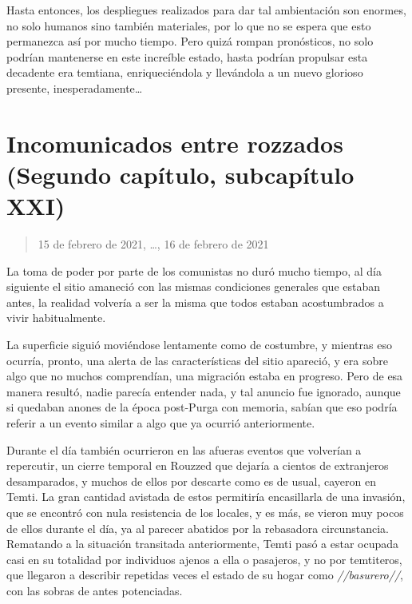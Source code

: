 \documentclass[
  spanish,
]{book}
\begin{document}
Hasta entonces, los despliegues realizados para dar tal ambientación son enormes, no solo humanos sino también materiales, por lo que no se espera que esto permanezca así por mucho tiempo. Pero quizá rompan pronósticos, no solo podrían mantenerse en este increíble estado, hasta podrían propulsar esta decadente era temtiana, enriqueciéndola y llevándola a un nuevo glorioso presente, inesperadamente\ldots{}

\hypertarget{incomunicados-entre-rozzados-segundo-capuxedtulo-subcapuxedtulo-xxi}{%
\section{Incomunicados entre rozzados (Segundo capítulo, subcapítulo XXI)}\label{incomunicados-entre-rozzados-segundo-capuxedtulo-subcapuxedtulo-xxi}}

\begin{quote}
15 de febrero de 2021, \ldots, 16 de febrero de 2021
\end{quote}

La toma de poder por parte de los comunistas no duró mucho tiempo, al día siguiente el sitio amaneció con las mismas condiciones generales que estaban antes, la realidad volvería a ser la misma que todos estaban acostumbrados a vivir habitualmente.

La superficie siguió moviéndose lentamente como de costumbre, y mientras eso ocurría, pronto, una alerta de las características del sitio apareció, y era sobre algo que no muchos comprendían, una migración estaba en progreso. Pero de esa manera resultó, nadie parecía entender nada, y tal anuncio fue ignorado, aunque si quedaban anones de la época post-Purga con memoria, sabían que eso podría referir a un evento similar a algo que ya ocurrió anteriormente.

Durante el día también ocurrieron en las afueras eventos que volverían a repercutir, un cierre temporal en Rouzzed que dejaría a cientos de extranjeros desamparados, y muchos de ellos por descarte como es de usual, cayeron en Temti. La gran cantidad avistada de estos permitiría encasillarla de una invasión, que se encontró con nula resistencia de los locales, y es más, se vieron muy pocos de ellos durante el día, ya al parecer abatidos por la rebasadora circunstancia. Rematando a la situación transitada anteriormente, Temti pasó a estar ocupada casi en su totalidad por individuos ajenos a ella o pasajeros, y no por temtiteros, que llegaron a describir repetidas veces el estado de su hogar como \emph{//basurero//}, con las sobras de antes potenciadas.
\end{document}
